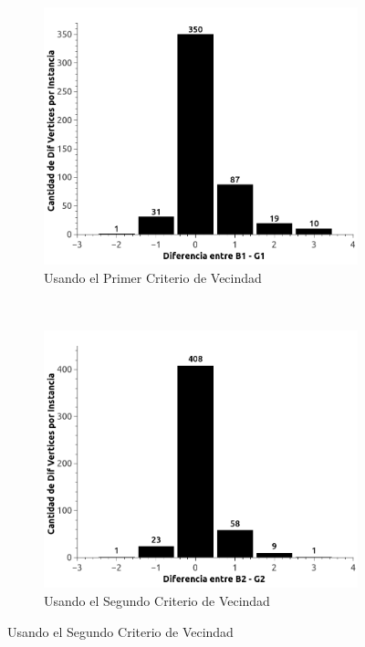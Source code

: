 \begin{itemize}
\begin{figure}[H]
        \centering
        \begin{subfigure}[b]{0.5\textwidth}
                \includegraphics[width=\textwidth]{imagenes/ejer4-B1vsG1.jpg}
                \caption{Usando el Primer Criterio de Vecindad}
        \end{subfigure}%
        ~ %
        \begin{subfigure}[b]{0.5\textwidth}
                \includegraphics[width=\textwidth]{imagenes/ejer4-B2vsG2.jpg}
                \caption{Usando el Segundo Criterio de Vecindad}
        \end{subfigure}
        
\end{figure}

\end{itemize}

